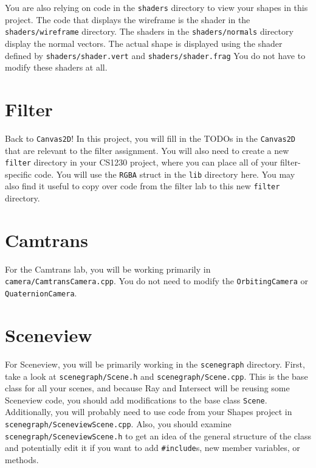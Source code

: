 \documentclass[landscape,twocolumn,letterpaper]{article}
\begin{document}
\noindent
You are also relying on code in the \texttt{shaders} directory to view your shapes in this project. The code that displays the wireframe is the shader in the \texttt{shaders/wireframe} directory. The shaders in the \texttt{shaders/normals} directory display the normal vectors. The actual shape is displayed using the shader defined by \texttt{shaders/shader.vert} and \texttt{shaders/shader.frag} You do not have to modify these shaders at all.\\

\section{Filter}

\noindent
Back to \texttt{Canvas2D}! In this project, you will fill in the TODOs in the \texttt{Canvas2D} that are relevant to the filter assignment. You will also need to create a new \texttt{filter} directory in your CS1230 project, where you can place all of your filter-specific code. You will use the \texttt{RGBA} struct in the \texttt{lib} directory here. You may also find it useful to copy over code from the filter lab to this new \texttt{filter} directory. \\

\section{Camtrans}

For the Camtrans lab, you will be working primarily in \texttt{camera/CamtransCamera.cpp}. You do not need to modify the \texttt{OrbitingCamera} or \texttt{QuaternionCamera}.

\section{Sceneview}

For Sceneview, you will be primarily working in the \texttt{scenegraph} directory. First, take a look at \texttt{scenegraph/Scene.h} and \texttt{scenegraph/Scene.cpp}. This is the base class for all your scenes, and because Ray and Intersect will be reusing some Sceneview code, you should add modifications to the base class \texttt{Scene}. Additionally, you will probably need to use code from your Shapes project in \texttt{scenegraph/SceneviewScene.cpp}. Also, you should examine \texttt{scenegraph/SceneviewScene.h} to get an idea of the general structure of the class and potentially edit it if you want to add \texttt{\#include}s, new member variables, or methods. \\
\end{document}
